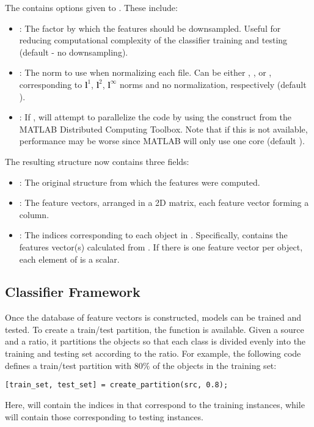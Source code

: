 \documentclass[twocolumn]{article}
\begin{document}
The  contains options given to . These include:
\begin{itemize}
	\item {}: The factor by which the features should be downsampled. Useful for reducing computational complexity of the classifier training and testing (default  - no downsampling).
	\item {}: The norm to use when normalizing each file. Can be either , ,  or \mcode{[]}, corresponding to $\mathbf{l}^1$, $\mathbf{l}^2$, $\mathbf{l}^\infty$ norms and no normalization, respectively (default \mcode{[]}).
	\item {}: If ,  will attempt to parallelize the code by using the  construct from the MATLAB Distributed Computing Toolbox. Note that if this is not available, performance may be worse since MATLAB will only use one core (default ).
\end{itemize}

The resulting  structure now contains three fields:
\begin{itemize}
	\item {}: The original  structure from which the features were computed.
	\item {}: The feature vectors, arranged in a 2D matrix, each feature vector forming a column.
	\item {}: The indices corresponding to each object in . Specifically,  contains the features vector(s) calculated from . If there is one feature vector per object, each element of  is a scalar.
\end{itemize}

\subsection{Classifier Framework}
Once the database of feature vectors is constructed, models can be trained and tested. To create a train/test partition, the function  is available. Given a source  and a ratio, it partitions the objects so that each class is divided evenly into the training and testing set according to the ratio. For example, the following code defines a train/test partition with $80\%$ of the objects in the training set:
\begin{lstlisting}
[train_set, test_set] = create_partition(src, 0.8);
\end{lstlisting}
Here,  will contain the indices in  that correspond to the training instances, while  will contain those corresponding to testing instances.
\end{document}
